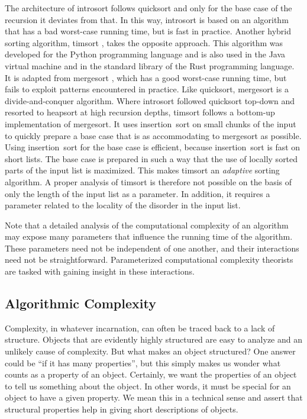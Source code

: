 \begin{example}
  The architecture of introsort follows quicksort and only for the base case of the recursion it deviates from that.
  In this way, introsort is based on an algorithm that has a bad worst-case running time, but is  fast in practice.
  Another hybrid sorting algorithm, timsort \parencite{peters:timsort}, takes the opposite approach.
  This algorithm was developed for the Python programming language and is also used in the Java virtual machine and in the standard library of the Rust programming language.
  It is adapted from mergesort \parencite{cormen2009introduction}, which has a good worst-case running time, but fails to exploit patterns encountered in practice.
  Like quicksort, mergesort is a divide-and-conquer algorithm.
  Where introsort followed quicksort top-down and resorted to heapsort at high recursion depths, timsort follows a bottom-up implementation of mergesort.
  It uses insertion~sort on small chunks of the input to quickly prepare a base case that is as accommodating to mergesort as possible.
  Using insertion~sort for the base case is efficient, because insertion~sort is fast on short lists.
  The base case is prepared in such a way that the use of locally sorted parts of the input list is maximized.
  This makes timsort an \emph{adaptive} sorting algorithm.
  A proper analysis of timsort is therefore not possible on the basis of only the length of the input list as a parameter.
  In addition, it requires a parameter related to the locality of the disorder in the input list.
\end{example}

Note that a detailed analysis of the computational complexity of an algorithm may expose many parameters that influence the running time of the algorithm.
These parameters need not be independent of one another, and their interactions need not be straightforward.
Parameterized computational complexity theorists are tasked with gaining insight in these interactions.

\subsection{Algorithmic Complexity}
\label{sec:history:algorithmic}%
Complexity, in whatever incarnation, can often be traced back to a lack of structure.
Objects that are evidently highly structured are easy to analyze and an unlikely cause of complexity.
But what makes an object structured?
One answer could be \enquote{if it has many properties}, but this simply makes us wonder what counts as a property of an object.
Certainly, we want the properties of an object to tell us something about the object.
In other words, it must be special for an object to have a given property.
We mean this in a technical sense and assert that structural properties help in giving short descriptions of objects.

